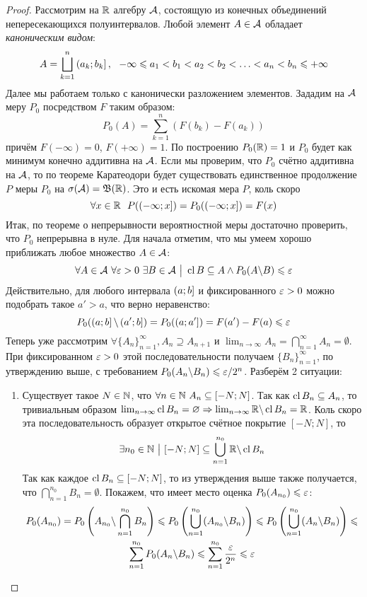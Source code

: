 \begin{proof}
	Рассмотрим на $\mathbb{R}$ алгебру $\mathcal{A}$, состоящую из конечных объединений непересекающихся полуинтервалов. Любой элемент $A \in \mathcal{A}$ обладает \textit{каноническим видом}:
	\[
		A = \bigsqcup_{k = 1}^n \left(a_k; b_k\right],\ \ -\infty \leqslant a_1 < b_1 < a_2 < b_2 < \ldots < a_n < b_n \leqslant +\infty
	\]
	Далее мы работаем только с канонически разложением элементов. Зададим на $\mathcal{A}$ меру $P_0$ посредством $F$ таким образом:
	\[
		P_0(A) = \sum_{k = 1}^n (F(b_k) - F(a_k))
	\]
	причём $F(-\infty) = 0$, $F(+\infty) = 1$. По построению $P_0(\mathbb{R}) = 1$ и $P_0$ будет как минимум конечно аддитивна на $\mathcal{A}$. Если мы проверим, что $P_0$ счётно аддитивна на $\mathcal{A}$, то по теореме Каратеодори будет существовать единственное продолжение $P$ меры $P_0$ на $\sigma(\mathcal{A}) = \mathfrak{B}(\mathbb{R})$. Это и есть искомая мера $P$, коль скоро
	\[
		\forall x \in \R\ \ P(\rsi{-\infty; x}) = P_0(\rsi{-\infty; x}) = F(x)
	\]
	Итак, по теореме о непрерывности вероятностной меры достаточно проверить, что $P_0$ непрерывна в нуле. Для начала отметим, что мы умеем хорошо приближать любое множество $A \in \mathcal{A}$:
	\[
		\forall A \in \mathcal{A}\ \forall \varepsilon > 0\ \exists B \in \mathcal{A} \ \big|\  \operatorname{cl} B \subseteq A \wedge P_0(A \backslash B) \leqslant \varepsilon
	\]
	Действительно, для любого интервала $\left(a; b\right]$ и фиксированного $\varepsilon > 0$ можно подобрать такое $a' > a$, что верно неравенство:
	\[
		P_0(\left(a; b\right] \backslash \left(a'; b\right]) = P_0(\left(a; a'\right]) = F(a') - F(a) \leqslant \varepsilon
	\]
	Теперь уже рассмотрим $\forall \{A_n\}_{n = 1}^\infty, A_n \supseteq A_{n + 1}$ и $\lim_{n \to \infty} A_n = \bigcap_{n = 1}^\infty A_n = \emptyset$. При фиксированном $\varepsilon > 0$ этой последовательности получаем $\{B_n\}_{n = 1}^\infty$, по утверждению выше, с требованием $P_0(A_n \backslash B_n) \leqslant \varepsilon / 2^n$. Разберём 2 ситуации:
	\begin{enumerate}
		\item Существует такое $N \in \mathbb{N}$, что $\forall n \in \mathbb{N}\ A_n \subseteq [-N; N]$. Так как $\operatorname{cl} B_n \subseteq A_n$, то тривиальным образом $\lim_{n \to \infty} \operatorname{cl} B_n = \varnothing \Rightarrow \lim_{n \to \infty} \mathbb{R} \backslash \operatorname{cl} B_n = \mathbb{R}$. Коль скоро эта последовательность образует открытое счётное покрытие $[-N; N]$, то
		\[
			\exists n_0 \in \mathbb{N} \ \big|\  [-N; N] \subseteq \bigcup_{n = 1}^{n_0} \mathbb{R} \backslash \operatorname{cl} B_n 
		\]
		Так как каждое $\operatorname{cl} B_n \subseteq [-N; N]$, то из утверждения выше также получается, что $\bigcap_{n = 1}^{n_0} B_n = \emptyset$. Покажем, что имеет место оценка $P_0(A_{n_0}) \leqslant \varepsilon$:
		\begin{multline*}
			P_0(A_{n_0}) = P_0\left(A_{n_0} \backslash \bigcap_{n = 1}^{n_0} B_n\right) \leqslant P_0\left(\bigcup_{n = 1}^{n_0} (A_{n_0} \backslash B_n)\right) \leqslant P_0\left(\bigcup_{n = 1}^{n_0} (A_n \backslash B_n)\right) \leqslant
			\\
			\sum_{n = 1}^{n_0} P_0(A_n \backslash B_n) \leqslant \sum_{n = 1}^{n_0} \frac{\varepsilon}{2^n} \leqslant \varepsilon
		\end{multline*}
		

\end{enumerate}
\end{proof}
